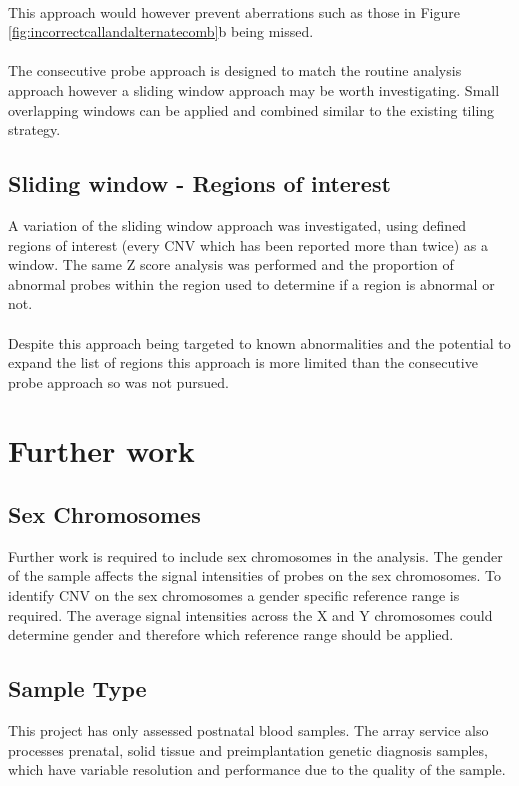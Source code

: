 \paragraph*{}
This approach would however prevent aberrations such as those in Figure \ref{fig:incorrectcallandalternatecomb}b being missed.
\paragraph*{}
The consecutive probe approach is designed to match the routine analysis approach however a sliding window approach may be worth investigating. Small overlapping windows can be applied and combined similar to the existing tiling strategy.

\subsection{Sliding window - Regions of interest}
A variation of the sliding window approach was investigated, using defined regions of interest (every CNV which has been reported more than twice) as a window. The same Z score analysis was performed and the proportion of abnormal probes within the region used to determine if a region is abnormal or not.
\paragraph*{}
Despite this approach being targeted to known abnormalities and the potential to expand the list of regions this approach is more limited than the consecutive probe approach so was not pursued.

\section{Further work}
\subsection{Sex Chromosomes}
Further work is required to include sex chromosomes in the analysis. The gender of the sample affects the signal intensities of probes on the sex chromosomes. To identify CNV on the sex chromosomes a gender specific reference range is required. The average signal intensities across the X and Y chromosomes could determine gender and therefore which reference range should be applied.
\subsection{Sample Type}
This project has only assessed postnatal blood samples. The array service also processes prenatal, solid tissue and preimplantation genetic diagnosis samples, which have variable resolution and performance due to the quality of the sample. 
